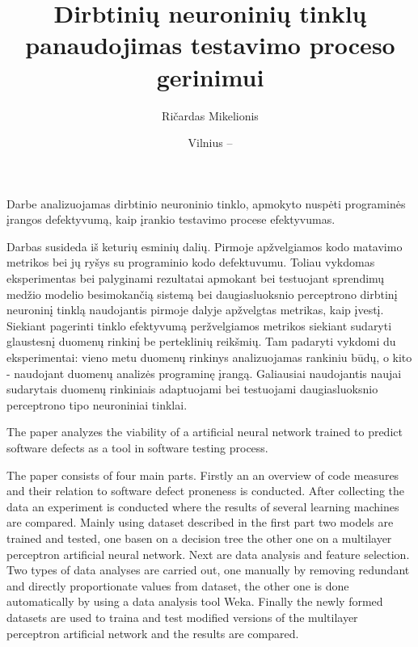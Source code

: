 \documentclass{VUMIFPSbakalaurinis}
\title{Dirbtinių neuroninių tinklų panaudojimas testavimo proceso gerinimui}
\author{Ričardas Mikelionis}
\date{Vilnius – \the\year}
\begin{document}
\maketitle


Darbe analizuojamas dirbtinio neuroninio tinklo, apmokyto nuspėti programinės įrangos defektyvumą, kaip įrankio testavimo procese efektyvumas.

Darbas susideda iš keturių esminių dalių. Pirmoje apžvelgiamos kodo matavimo metrikos bei jų ryšys su programinio kodo defektuvumu. Toliau vykdomas eksperimentas bei palyginami rezultatai apmokant bei testuojant sprendimų medžio modelio besimokančią sistemą bei daugiasluoksnio perceptrono dirbtinį neuroninį tinklą naudojantis pirmoje dalyje apžvelgtas metrikas, kaip įvestį. Siekiant pagerinti tinklo efektyvumą peržvelgiamos metrikos siekiant sudaryti glaustesnį duomenų rinkinį be perteklinių reikšmių. Tam padaryti vykdomi du eksperimentai: vieno metu duomenų rinkinys analizuojamas rankiniu būdų, o kito - naudojant duomenų analizės programinę įrangą. Galiausiai naudojantis naujai sudarytais duomenų rinkiniais adaptuojami bei testuojami daugiasluoksnio perceptrono tipo neuroniniai tinklai.

The paper analyzes the viability of a artificial neural network trained to predict software defects as a tool in software testing process.

The paper consists of four main parts. Firstly an an overview of code measures and their relation to software defect proneness is conducted. After collecting the data an experiment is conducted where the results of several learning machines are compared. Mainly using dataset described in the first part two models are trained and tested, one basen on a decision tree the other one on a multilayer perceptron artificial neural network. Next are data analysis and feature selection. Two types of data analyses are carried out, one manually by removing redundant and directly proportionate values from dataset, the other one is done automatically by using a data analysis tool Weka. Finally the newly formed datasets are used to traina and test modified versions of the multilayer perceptron artificial network and the results are compared.
\end{document}
